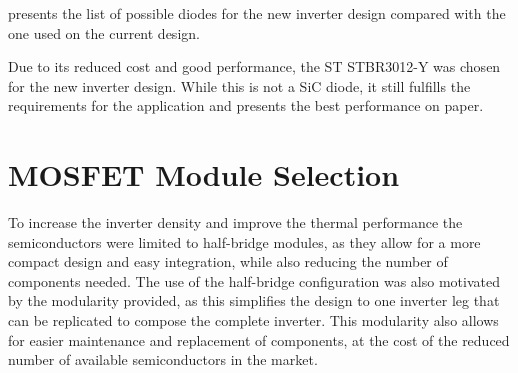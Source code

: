  presents the list of possible diodes for the new inverter design compared with the one used on the current design.
\begin{table}[H]
	\centering
	\caption{List of possible diodes for the new inverter design compared to the solution used on the current design.}
	\label{tab:diode_list}
\end{table}

Due to its reduced cost and good performance, the ST STBR3012-Y was chosen for the new inverter design. While this is not a SiC diode, it still fulfills the requirements for the application and presents the best performance on paper.

\section{MOSFET Module Selection}


To increase the inverter density and improve the thermal performance the semiconductors were limited to half-bridge modules, as they allow for a more compact design and easy integration, while also reducing the number of components needed. The use of the half-bridge configuration was also motivated by the modularity provided, as this simplifies the design to one inverter leg that can be replicated to compose the complete inverter. This modularity also allows for easier maintenance and replacement of components, at the cost of the reduced number of available semiconductors in the market.


